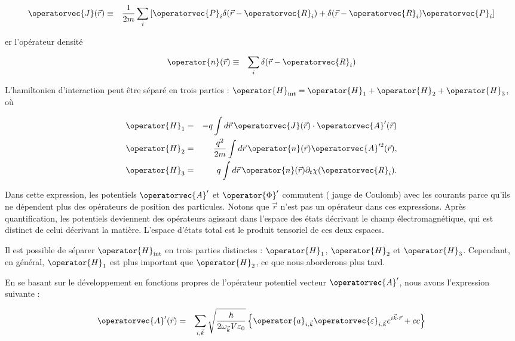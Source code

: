 \begin{eqnarray}
	\operatorvec{J}(\vec{r}) & \equiv &  \frac{1}{2m} \sum_i \left[ \operatorvec{P}_i \delta(\vec{r} - \operatorvec{R}_i) + \delta(\vec{r} - \operatorvec{R}_i) \operatorvec{P}_i \right]	
\end{eqnarray}

er l'opérateur densité 

\begin{eqnarray}
	\operator{n}(\vec{r}) & \equiv &  \sum_i \delta(\vec{r} - \operatorvec{R}_i)		
\end{eqnarray}


	

L'hamiltonien d'interaction peut être séparé en trois parties : \( \operator{H}_{\text{int}} = \operator{H}_1 + \operator{H}_2 + \operator{H}_3 \), où

\begin{eqnarray}
	 \operator{H}_1  &=& -q \int d\vec{r}\, \operatorvec{J}(\vec{r}) \cdot \operatorvec{A}'(\vec{r})\\
	  \operator{H}_2  &=& \frac{q^2}{2m} \int d\vec{r}\, \operator{n}(\vec{r}) \operatorvec{A}'^2(\vec{r})	,\\
	  \operator{H}_3 & =&  q \int d\vec{r}\, \operator{n}(\vec{r}) \partial_t \chi (\operatorvec{R}_i).
\end{eqnarray}

Dans cette expression, les potentiels \( \operatorvec{A}' \) et \( \operator{\Phi}' \) commutent ( jauge de Coulomb) avec les courants parce qu'ils ne dépendent plus des opérateurs de position des particules. Notons que \( \vec{r} \) n'est pas un opérateur dans ces expressions. Après quantification, les potentiels deviennent des opérateurs agissant dans l'espace des états décrivant le champ électromagnétique, qui est distinct de celui décrivant la matière. L'espace d'états total est le produit tensoriel de ces deux espaces.

Il est possible de séparer \( \operator{H}_{\text{int}} \) en trois parties distinctes : \( \operator{H}_1 \), \( \operator{H}_2 \) et \( \operator{H}_3 \). Cependant, en général, \( \operator{H}_1 \) est plus important que \( \operator{H}_2 \), ce que nous aborderons plus tard.

En se basant sur le développement en fonctions propres de l'opérateur potentiel vecteur \( \operatorvec{A}' \), nous avons l'expression suivante :

\begin{eqnarray}
	\operatorvec{A}'(\vec{r}) &  = & \sum_{i, \vec{k}} \sqrt{\frac{\hbar}{2\omega_{\vec{k}} V \varepsilon_0}} \left\{ \operator{a}_{i , \vec{k}} \operatorvec{{\varepsilon}}_{i , \vec{k}}e^{i\vec{k}\cdot\vec{r}} + cc \right \}	
\end{eqnarray}

